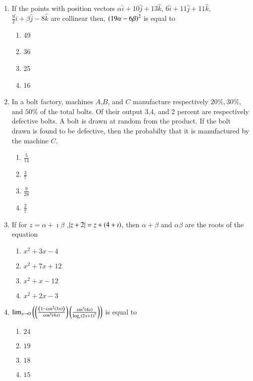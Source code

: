 \documentclass[journal]{IEEEtran}
\begin{document}
\begin{enumerate}
{\begin{multicols}{4}
\end{multicols}
}
\item{
If the points with position vectors $\alpha\hat{i}+10\hat{j}+13\hat{k}$, $6\hat{i}+11\hat{j}+11\hat{k}$, $\frac{9}{2}\hat{i}+\beta\hat{j}-8\hat{k}$ are collinear then, $\left(19\alpha-6\beta\right)^2$ is equal to
\begin{multicols}{4}
\begin{enumerate}
\item 49
\item 36
\item 25
\item 16
\end{enumerate}
\end{multicols}
}
\item{
In a bolt factory, machines $A$,$B$, and $C$ manufacture respectively $20\%, 30\%,$ and $50\%$ of the total bolts. Of their output 3,4, and 2 percent are respectively defective bolts. A bolt is drawn at random from the product. If the bolt drawn is found to be defective, then the probabilty that it is manufactured by the machine $C$.
\begin{multicols}{4}
\begin{enumerate}
\item $\frac{5}{14}$
\item $\frac{3}{7}$
\item $\frac{9}{28}$
\item $\frac{2}{7}$
\end{enumerate}
\end{multicols}
}
\item{
If for $z=\alpha+\imath\beta$  ,$\left\vert z+2\right\vert=z+\left(4+\imath\right)$, then $\alpha+\beta$ and $\alpha\beta$ are the roots of the equation
\begin{multicols}{4}
\begin{enumerate}
\item $x^2+3x-4$
\item $x^2+7x+12$
\item $x^2+x-12$
\item $x^2+2x-3$
\end{enumerate}
\end{multicols}
}
\item{
$\lim_{x \to 0}\left(\left(\frac{\left(1-\cos^2\left(3x\right)\right)}{\cos^3\left(4x\right)}\right)\left(\frac{sin^3\left(4x\right)}{\log_e\left(2x+1\right)^5}\right)\right)$ is equal to
\begin{multicols}{4}
\begin{enumerate}
\item $24$
\item $19$
\item $18$
\item $15$
\end{enumerate}
\end{multicols}
}
\end{enumerate}
\end{document}
